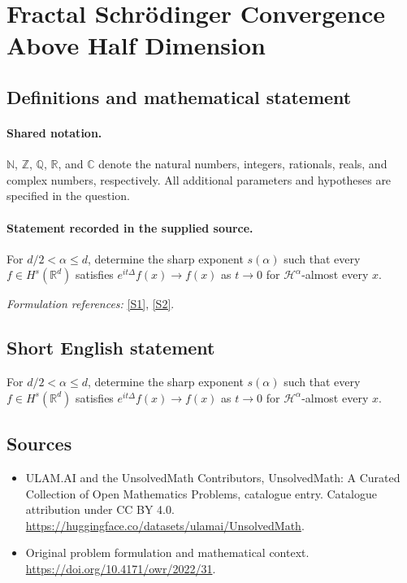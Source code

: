 \documentclass[11pt]{article}
\newcommand{\sref}[2]{\hyperlink{source:#1:#2}{[S#2]}}
\begin{document}
\section{Fractal Schrödinger Convergence Above Half Dimension}\label{statement}

\subsection{Definitions and mathematical statement}

\paragraph{Shared notation.}$\mathbb N$, $\mathbb Z$, $\mathbb Q$, $\mathbb R$, and $\mathbb C$ denote the natural numbers, integers, rationals, reals, and complex numbers, respectively. All additional parameters and hypotheses are specified in the question.


\paragraph{Statement recorded in the supplied source.}
For $d/2<\alpha\leq d$, determine the sharp exponent $s(\alpha)$ such that every $f\in H^s(\mathbb R^d)$ satisfies $e^{it\Delta}f(x)\to f(x)$ as $t\to0$ for $\mathcal H^\alpha$-almost every $x$.
\par\smallskip\textit{Formulation references:} \sref{statement}{1}, \sref{statement}{2}.
\subsection{Short English statement}
For $d/2<\alpha\leq d$, determine the sharp exponent $s(\alpha)$ such that every $f\in H^s(\mathbb R^d)$ satisfies $e^{it\Delta}f(x)\to f(x)$ as $t\to0$ for $\mathcal H^\alpha$-almost every $x$.
\subsection{Sources}
\begin{itemize}
\item[\hypertarget{source:statement:1}{S1}] ULAM.AI and the UnsolvedMath Contributors, UnsolvedMath: A Curated Collection of Open Mathematics Problems, catalogue entry. Catalogue attribution under CC BY 4.0.
\url{https://huggingface.co/datasets/ulamai/UnsolvedMath}.
\item[\hypertarget{source:statement:2}{S2}] Original problem formulation and mathematical context.
\url{https://doi.org/10.4171/owr/2022/31}.
\end{itemize}
\label{end:statement}
\end{document}
